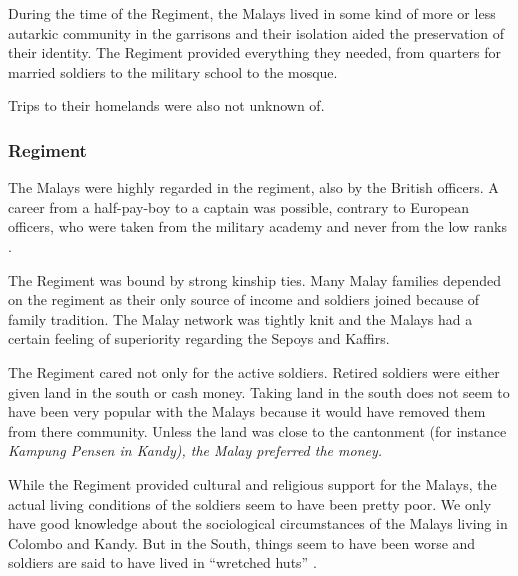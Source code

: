During the time of the Regiment, the Malays lived in some kind of
more or less autarkic community in the garrisons and their
isolation aided the preservation of their identity. The Regiment
provided everything they needed, from quarters for married
soldiers to the military school to the mosque.


Trips to their homelands were also not unknown of.




\subsubsection{Regiment}\label{sec:slmbg:Regiment}
The Malays were highly regarded in the regiment, also by the British officers. A career from a half-pay-boy to a captain was possible, contrary to European officers, who were taken from the military academy and never from the low ranks \citep[122]{Hussainmiya1990}.

The Regiment was bound by strong kinship ties. Many Malay families depended on the regiment as their only source of income \citep[78]{Hussainmiya1990} and soldiers joined because of family tradition. The Malay network was tightly knit and the Malays had a certain feeling of superiority regarding the Sepoys and Kaffirs.



The Regiment cared not only for the active soldiers. Retired soldiers were either given land in the south or cash money. Taking land in the south does not seem to have been very popular with the Malays because it would have removed them from there community. Unless the land was close to the cantonment (for instance \em Kampung Pensen \em in Kandy), the Malay preferred the money.

While the Regiment provided cultural and religious support for the Malays, the actual living conditions of the soldiers seem  to have been pretty poor. We  only have good  knowledge about the sociological circumstances of the Malays living in Colombo and Kandy. But in the South, things seem to have been worse and soldiers are said to have lived in ``wretched huts'' \cite[115f]{Hussainmiya1990}.

